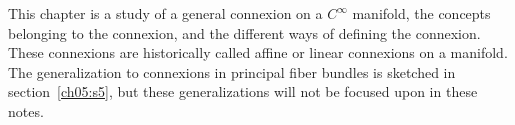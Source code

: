 This chapter is a study of a general connexion on a $C^{\infty}$ manifold, the concepts belonging to the connexion, and the different ways of defining the connexion. These connexions are historically called affine or linear connexions on a manifold. The generalization to connexions in principal fiber bundles is sketched in section~\ref{ch05:s5}, but these generalizations will not be focused upon in these notes.